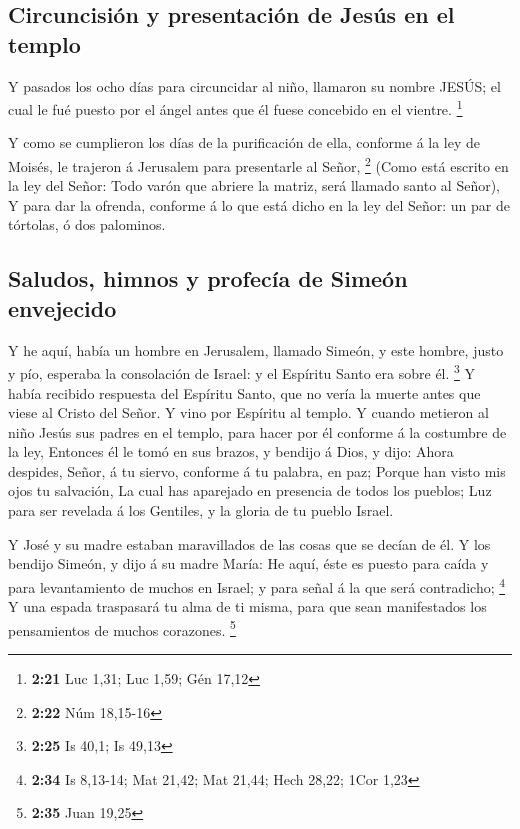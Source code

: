 \hypertarget{circuncisiuxf3n-y-presentaciuxf3n-de-jesuxfas-en-el-templo}{%
\subsection{Circuncisión y presentación de Jesús en el
templo}\label{circuncisiuxf3n-y-presentaciuxf3n-de-jesuxfas-en-el-templo}}

 Y pasados los ocho días para circuncidar al niño, llamaron
su nombre JESÚS; el cual le fué puesto por el ángel antes que él fuese
concebido en el vientre. \footnote{\textbf{2:21} Luc 1,31; Luc 1,59; Gén
  17,12}

 Y como se cumplieron los días de la purificación de ella,
conforme á la ley de Moisés, le trajeron á Jerusalem para presentarle al
Señor, \footnote{\textbf{2:22} Núm 18,15-16}  (Como está
escrito en la ley del Señor: Todo varón que abriere la matriz, será
llamado santo al Señor),  Y para dar la ofrenda, conforme á
lo que está dicho en la ley del Señor: un par de tórtolas, ó dos
palominos.

\hypertarget{saludos-himnos-y-profecuxeda-de-simeuxf3n-envejecido}{%
\subsection{Saludos, himnos y profecía de Simeón
envejecido}\label{saludos-himnos-y-profecuxeda-de-simeuxf3n-envejecido}}

 Y he aquí, había un hombre en Jerusalem, llamado Simeón, y
este hombre, justo y pío, esperaba la consolación de Israel: y el
Espíritu Santo era sobre él. \footnote{\textbf{2:25} Is 40,1; Is 49,13}
 Y había recibido respuesta del Espíritu Santo, que no
vería la muerte antes que viese al Cristo del Señor.  Y
vino por Espíritu al templo. Y cuando metieron al niño Jesús sus padres
en el templo, para hacer por él conforme á la costumbre de la ley,
 Entonces él le tomó en sus brazos, y bendijo á Dios, y
dijo:  Ahora despides, Señor, á tu siervo, conforme á tu
palabra, en paz;  Porque han visto mis ojos tu salvación,
 La cual has aparejado en presencia de todos los pueblos;
 Luz para ser revelada á los Gentiles, y la gloria de tu
pueblo Israel.

 Y José y su madre estaban maravillados de las cosas que se
decían de él.  Y los bendijo Simeón, y dijo á su madre
María: He aquí, éste es puesto para caída y para levantamiento de muchos
en Israel; y para señal á la que será contradicho; \footnote{\textbf{2:34}
  Is 8,13-14; Mat 21,42; Mat 21,44; Hech 28,22; 1Cor 1,23} 
Y una espada traspasará tu alma de ti misma, para que sean manifestados
los pensamientos de muchos corazones. \footnote{\textbf{2:35} Juan 19,25}

